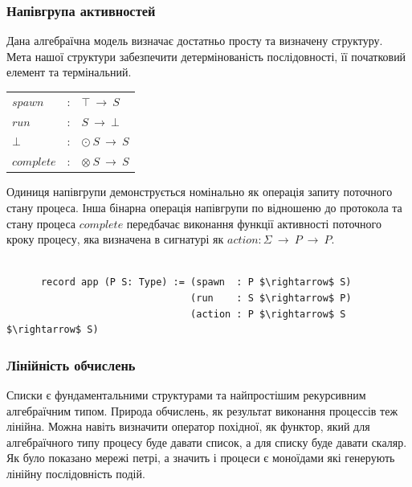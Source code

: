 \documentclass[11pt,oneside]{article}
\begin{document}
  \subsubsection{Напівгрупа активностей}

  Дана алгебраїчна модель визначає достатньо просту та визначену структуру.
  Мета нашої структури забезпечити детермінованість послідовності,
  її початковий елемент та термінальний. 

\begin{center}
\begin{tabular}{lcl}
$spawn$       &:& $\top\ \rightarrow\ S$\\
$run$         &:& $S\ \rightarrow\ \bot$\\
$\bot$        &:& $\odot\ S\ \rightarrow\ S$\\
$complete$    &:& $\otimes\ S\ \rightarrow\ S$\\
\end{tabular}
\end{center}

  Одиниця напівгрупи
  демонструється номінально як операція запиту поточного стану процеса.
  Інша бінарна операція напівгрупи по відношеню до протокола та стану процеса $complete$
  передбачає виконання функції активності поточного кроку процесу, яка
  визначена в сигнатурі як $action: \Sigma\ \rightarrow\ P\ \rightarrow\ P$.

\begin{center}
\begin{lstlisting}[mathescape=true]

      record app (P S: Type) := (spawn  : P $\rightarrow$ S)
                                (run    : S $\rightarrow$ P)
                                (action : P $\rightarrow$ S $\rightarrow$ S)

\end{lstlisting}
\end{center}

  \subsubsection{Лінійність обчислень}
   Списки є фундаментальними структурами та найпростішим рекурсивним алгебраїчним типом.
   Природа обчислень, як результат виконання процессів теж лінійна. Можна навіть визначити
   оператор похідної, як функтор, який для алгебраїчного типу процесу буде давати список,
   а для списку буде давати скаляр. Як було показано \cite{meseguer} мережі петрі,
   а значить і процеси є моноїдами які генерують лінійну послідовність подій.
\end{document}

